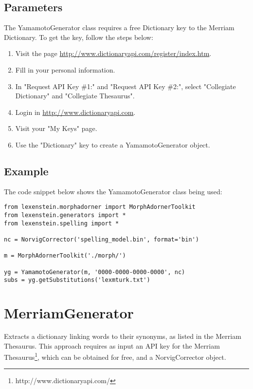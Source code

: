 \subsection{Parameters}

The YamamotoGenerator class requires a free Dictionary key to the Merriam Dictionary. To get the key, follow the steps below:

\begin{enumerate}
\item Visit the page \url{http://www.dictionaryapi.com/register/index.htm}.
\item Fill in your personal information.
\item In "Request API Key \#1:" and "Request API Key \#2:", select "Collegiate Dictionary" and "Collegiate Thesaurus".
\item Login in \url{http://www.dictionaryapi.com}.
\item Visit your "My Keys" page.
\item Use the "Dictionary" key to create a YamamotoGenerator object.
\end{enumerate}

\subsection{Example}

The code snippet below shows the YamamotoGenerator class being used:

\begin{lstlisting}
from lexenstein.morphadorner import MorphAdornerToolkit
from lexenstein.generators import *
from lexenstein.spelling import *

nc = NorvigCorrector('spelling_model.bin', format='bin')

m = MorphAdornerToolkit('./morph/')

yg = YamamotoGenerator(m, '0000-0000-0000-0000', nc)
subs = yg.getSubstitutions('lexmturk.txt')
\end{lstlisting}













\section{MerriamGenerator}

Extracts a dictionary linking words to their synonyms, as listed in the Merriam Thesaurus. This approach requires as input an API key for the Merriam Thesaurus\footnote{http://www.dictionaryapi.com/}, which can be obtained for free, and a NorvigCorrector object.

